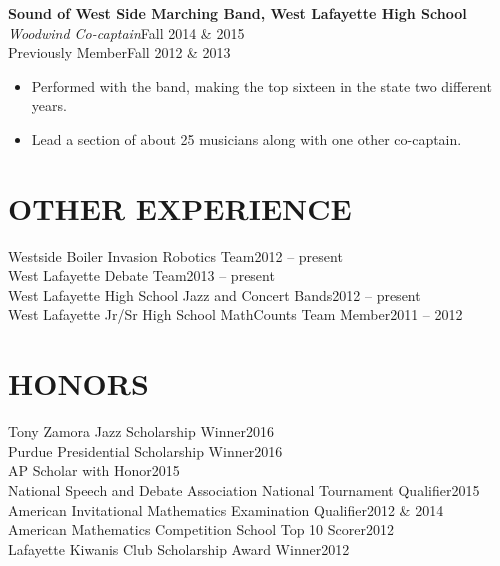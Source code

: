 \documentclass[line,margin]{res}
\begin{document}
\begin{resume}

        {\bf\rmfamily Sound of West Side Marching Band, West Lafayette High School}\\
        \emph{Woodwind Co-captain}\hfill Fall 2014 \& 2015\\
        Previously Member\hfill Fall 2012 \& 2013
        \begin{itemize}  \itemsep -2pt %
        \item Performed with the band, making the top sixteen in the state two different years.
        \item Lead a section of about 25 musicians along with one other co-captain.
        \end{itemize}


\section{OTHER EXPERIENCE}
Westside Boiler Invasion Robotics Team\hfill 2012 -- present\\
West Lafayette Debate Team\hfill 2013 -- present\\
West Lafayette High School Jazz and Concert Bands\hfill 2012 -- present\\
West Lafayette Jr/Sr High School MathCounts Team Member\hfill 2011 -- 2012


\section{HONORS}
Tony Zamora Jazz Scholarship Winner\hfill 2016\\
Purdue Presidential Scholarship Winner\hfill 2016\\
AP Scholar with Honor\hfill 2015\\
National Speech and Debate Association National Tournament Qualifier\hfill 2015\\
American Invitational Mathematics Examination Qualifier\hfill 2012 \& 2014\\
American Mathematics Competition School Top 10 Scorer\hfill 2012\\
Lafayette Kiwanis Club Scholarship Award Winner\hfill 2012



\end{resume}
\end{document}
